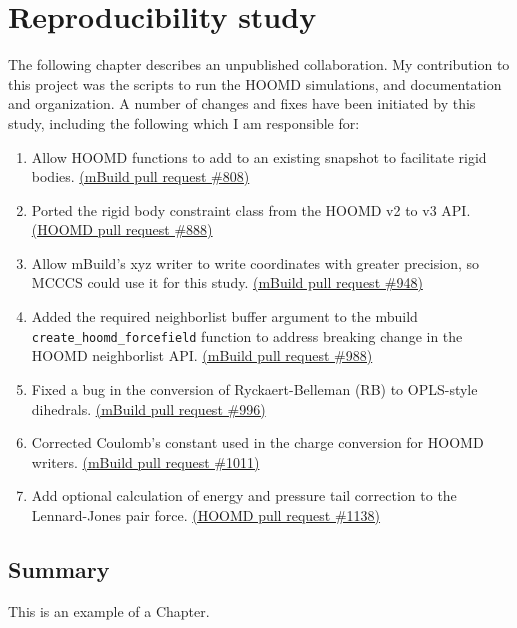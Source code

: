 \chapter{Reproducibility study}
\label{chap:reproducibility}

The following chapter describes an unpublished collaboration.
My contribution to this project was the scripts to run the HOOMD simulations, and documentation and organization. 
A number of changes and fixes have been initiated by this study, including the following which I am responsible for:
\begin{enumerate}
    \item Allow HOOMD functions to add to an existing snapshot to facilitate rigid bodies. \href{https://github.com/mosdef-hub/mbuild/pull/808}{(mBuild pull request \#808)}
    \item Ported the rigid body constraint class from the HOOMD v2 to v3 API. \href{https://github.com/glotzerlab/hoomd-blue/pull/888}{(HOOMD pull request \#888)}
    \item Allow mBuild's xyz writer to write coordinates with greater precision, so MCCCS could use it for this study. \href{https://github.com/mosdef-hub/mbuild/pull/996}{(mBuild pull request \#948)}
    \item Added the required neighborlist buffer argument to the mbuild \lstinline{create_hoomd_forcefield} function to address breaking change in the HOOMD neighborlist API. \href{https://github.com/mosdef-hub/mbuild/pull/988}{(mBuild pull request \#988)}
    \item Fixed a bug in the conversion of Ryckaert-Belleman (RB) to OPLS-style dihedrals. \href{https://github.com/mosdef-hub/mbuild/pull/996}{(mBuild pull request \#996)}
    \item Corrected Coulomb's constant used in the charge conversion for HOOMD writers. \href{https://github.com/mosdef-hub/mbuild/pull/1011}{(mBuild pull request \#1011)}
    \item Add optional calculation of energy and pressure tail correction to the Lennard-Jones pair force. \href{https://github.com/glotzerlab/hoomd-blue/pull/1138}{(HOOMD pull request \#1138)}
\end{enumerate}

\section{Summary}
 
This is an example of a Chapter. 

